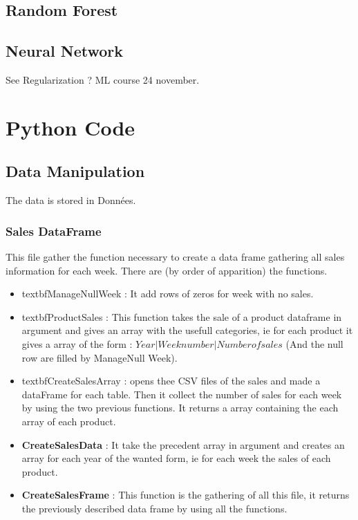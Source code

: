 \documentclass{report}
\begin{document}
\section{Random Forest}


\section{Neural Network}




See Regularization ? ML course 24 november.

\chapter{Python Code}

\section{Data Manipulation}
The data is stored in Données.\\

\subsection{Sales DataFrame}

This file gather the function necessary to create a data frame gathering all sales information for each week. There are (by order of apparition) the functions.

\begin{itemize}
\item textbf{ManageNullWeek} : It add rows of zeros for week with no sales.
\item textbf{ProductSales} : This function takes the sale of a product dataframe in argument and gives an array with the usefull categories, ie for each product it gives a array of the form : $Year | Week number  | Number of sales$ (And the null row are filled by ManageNull Week).
\item textbf{CreateSalesArray} : opens thee CSV files of the sales and made a dataFrame for each table. Then it collect the number of sales for each week by using the two previous functions. It returns a array containing the each array of each product.
\item \textbf{CreateSalesData} : It take the precedent array in argument and creates an array for each year of the wanted form, ie for each week the sales of each product.
\item \textbf{CreateSalesFrame} : This function is the gathering of all this file, it returns the previously described data frame by using all the functions.
\end{itemize}
\end{document}
